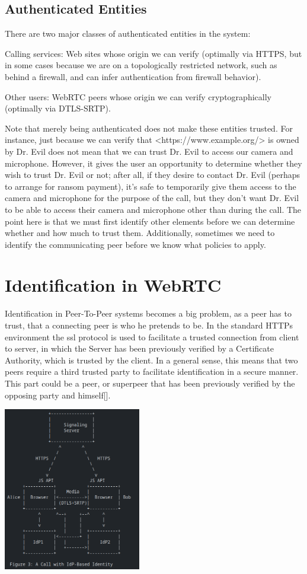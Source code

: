 \documentclass[conference]{IEEEtran}
\begin{document}
\subsection{Authenticated Entities}

There are two major classes of authenticated entities in the system:

Calling services:
    Web sites whose origin we can verify (optimally via HTTPS, but in some cases because we are on a topologically restricted 
    network, such as behind a firewall, and can infer authentication from firewall behavior).

Other users:
    WebRTC peers whose origin we can verify cryptographically (optimally via DTLS-SRTP).

Note that merely being authenticated does not make these entities trusted. For instance, just because we can verify that 
<https://www.example.org/> is owned by Dr. Evil does not mean that we can trust Dr. Evil to access our camera and microphone. 
However, it gives the user an opportunity to determine whether they wish to trust Dr. Evil or not; after all, if they desire to 
contact Dr. Evil (perhaps to arrange for ransom payment), it's safe to temporarily give them access to the camera and microphone 
for the purpose of the call, but they don't want Dr. Evil to be able to access their camera and microphone other than during the 
call. The point here is that we must first identify other elements before we can determine whether and how much to trust them.
 Additionally, sometimes we need to identify the communicating peer before we know what policies to apply.

\section{Identification in WebRTC}
Identification in Peer-To-Peer systems becomes a big problem, as a peer has to trust,
that a connecting peer is who he pretends to be. In the standard HTTPs environment the ssl
protocol is used to facilitate a trusted connection from client to server, in which the Server
has been previously verified by a Certificate Authority, which is trusted by the client. 
In a general sense, this means that two peers require a third trusted party to facilitate
identification in a secure manner. This part could be a peer, or superpeer that has been previously verified
by the opposing party and himself[]. %

\includegraphics[width=0.45\textwidth]{call with IdP Based Identity.png}
\end{document}
